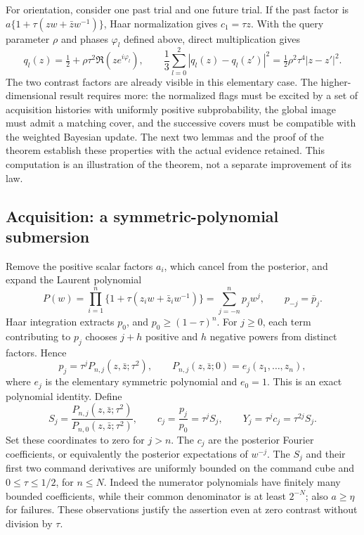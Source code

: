\documentclass[11pt]{amsart}
\theoremstyle{definition}\newtheorem{definition}[theorem]{Definition}
\theoremstyle{remark}\newtheorem{remark}[theorem]{Remark}
\begin{document}
For orientation, consider one past trial and one future trial. If the
past factor is $a\{1+\tau(zw+\bar z w^{-1})\}$, Haar normalization
gives $c_1=\tau z$. With the query parameter $\rho$ and phases
$\varphi_l$ defined above, direct multiplication gives
\[
 q_l(z)=\tfrac12+\rho\tau^2\Re(ze^{i\varphi_l}),\qquad
 \frac13\sum_{l=0}^{2}|q_l(z)-q_l(z')|^2
       =\tfrac12\rho^2\tau^4|z-z'|^2.
\]
The two contrast factors are already visible in this elementary case.
The higher-dimensional result requires more: the normalized flags must
be excited by a set of acquisition histories with uniformly positive
subprobability, the global image must admit a matching cover, and the
successive covers must be compatible with the weighted Bayesian update.
The next two lemmas and the proof of the theorem establish these
properties with the actual evidence retained. This computation is an
illustration of the theorem, not a separate improvement of its law.


\subsection{Acquisition: a symmetric-polynomial submersion}
Remove the positive scalar factors $a_i$, which cancel from the posterior,
and expand the Laurent polynomial
\begin{equation}\label{eq:circle-laurent}
 P(w)=\prod_{i=1}^n\{1+\tau(z_iw+\bar z_iw^{-1})\}
     =\sum_{j=-n}^{n}p_jw^j,
 \qquad p_{-j}=\bar p_j.
\end{equation}
Haar integration extracts $p_0$, and $p_0\ge(1-\tau)^n$.
For $j\ge0$, each term contributing to $p_j$ chooses $j+h$ positive
and $h$ negative powers from distinct factors. Hence
\begin{equation}\label{eq:circle-coefficient-factorization}
 p_j=\tau^j P_{n,j}(z,\bar z;\tau^2),\qquad
 P_{n,j}(z,\bar z;0)=e_j(z_1,\ldots,z_n),
\end{equation}
where $e_j$ is the elementary symmetric polynomial and $e_0=1$.
This is an exact polynomial identity. Define
\[
 S_j=\frac{P_{n,j}(z,\bar z;\tau^2)}{P_{n,0}(z,\bar z;\tau^2)},
 \qquad c_j=\frac{p_j}{p_0}=\tau^jS_j,
 \qquad Y_j=\tau^jc_j=\tau^{2j}S_j.
\]
Set these coordinates to zero for $j>n$. The $c_j$ are the posterior
Fourier coefficients, or equivalently the posterior expectations of
$w^{-j}$. The $S_j$ and their first two command derivatives are uniformly
bounded on the command cube and $0\le\tau\le1/2$, for $n\le N$.
Indeed the numerator polynomials have finitely many bounded coefficients,
while their common denominator is at least $2^{-N}$; also $a\ge\eta$
for failures. These observations justify the assertion even at zero
contrast without division by $\tau$.
\end{document}
